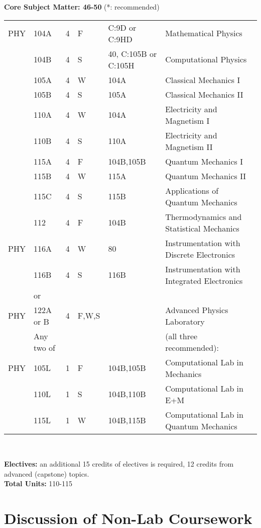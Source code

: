 \documentclass[12pt]{article}
\begin{document}
\newpage

\noindent
{\bf Core Subject Matter: 46-50} (*: recommended)\\ \vskip -0.25cm
\noindent
\begin{tabular}{|llllll|}
\hline
PHY & 104A & 4 & F & C:9D or C:9HD & Mathematical Physics \\ 
    & 104B & 4 & S & 40, C:105B or C:105H& Computational Physics\\
    & 105A & 4 & W & 104A & Classical Mechanics I\\
    & 105B & 4 & S & 105A & Classical Mechanics II\\ 
    & 110A & 4 & W & 104A & Electricity and Magnetism I\\
    & 110B & 4 & S & 110A&  Electricity and Magnetism II\\
    & 115A & 4 & F & 104B,105B & Quantum Mechanics I \\
    & 115B & 4 & W & 115A & Quantum Mechanics II \\
    & 115C & 4 & S & 115B & Applications of Quantum Mechanics\\ 
    & 112  & 4 & F & 104B & Thermodynamics and Statistical Mechanics\\    
\hline
PHY & 116A & 4 &  W & 80   & Instrumentation with Discrete Electronics  \\
    & 116B & 4 &  S & 116B & Instrumentation with Integrated Electronics\\ 
\hline
    & or & & & & \\
\hline
PHY & 122A or B & 4 & F,W,S & & Advanced Physics Laboratory \\  
\hline
 & Any two of & & & & (all three recommended): \\
\hline 
PHY & 105L & 1 & F & 104B,105B & Computational Lab in Mechanics \\
    & 110L & 1 & S & 104B,110B & Computational Lab in E+M \\ 
    & 115L & 1 & W & 104B,115B & Computational Lab in Quantum Mechanics \\ 
\hline
\end{tabular}\\ \vskip 0.25cm

\noindent
{\bf Electives:} an additional 15 credits of electives is required, 12 credits from advanced (capstone) topics.\\
\noindent
{\bf Total Units:} 110-115
\newpage
\onecolumn

\newpage
\section{Discussion of Non-Lab Coursework}
\end{document}
